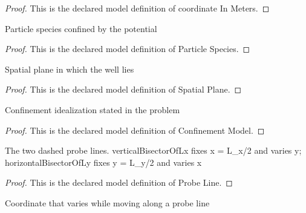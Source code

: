 \begin{proof}
  This is the declared model definition of coordinate In Meters.
\end{proof}
\begin{definition}
  \label{def:physics:phyx-mini-0584:phyxminiproblems-problemphyxmini0584-particlespecies}
  Particle species confined by the potential
\end{definition}
\begin{proof}
  This is the declared model definition of Particle Species.
\end{proof}
\begin{definition}
  \label{def:physics:phyx-mini-0584:phyxminiproblems-problemphyxmini0584-spatialplane}
  Spatial plane in which the well lies
\end{definition}
\begin{proof}
  This is the declared model definition of Spatial Plane.
\end{proof}
\begin{definition}
  \label{def:physics:phyx-mini-0584:phyxminiproblems-problemphyxmini0584-confinementmodel}
  Confinement idealization stated in the problem
\end{definition}
\begin{proof}
  This is the declared model definition of Confinement Model.
\end{proof}
\begin{definition}
  \label{def:physics:phyx-mini-0584:phyxminiproblems-problemphyxmini0584-probeline}
  The two dashed probe lines. verticalBisectorOfLx fixes x = L\_x/2 and varies y; horizontalBisectorOfLy fixes y = L\_y/2 and varies x
\end{definition}
\begin{proof}
  This is the declared model definition of Probe Line.
\end{proof}
\begin{definition}
  \label{def:physics:phyx-mini-0584:phyxminiproblems-problemphyxmini0584-probeline-variedaxis}
  Coordinate that varies while moving along a probe line
\end{definition}
